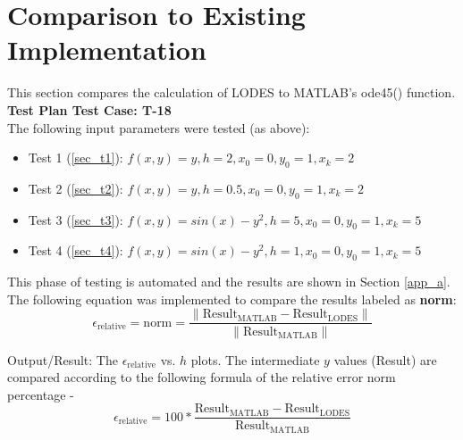 \documentclass[12pt, titlepage]{article}
\newcommand{\famname}{LODES} %
\begin{document}
	
\section{Comparison to Existing Implementation}	 \label{sec_comp_exist_imp}

This section compares the calculation of \famname{} to MATLAB's ode45() function.\\

\textbf{Test Plan Test Case: T-18}\\
The following input parameters were tested (as above):
\begin{itemize}
\item Test 1 (\ref{sec_t1}): $f(x,y) = y, h = 2,x_0 = 0,y_0 = 1,x_k = 2$
\item Test 2 (\ref{sec_t2}): $f(x,y) = y, h = 0.5,x_0 = 0,y_0 = 1,x_k = 2$
\item Test 3 (\ref{sec_t3}): $f(x,y) = sin(x) - y^2, h = 5,x_0 = 0,y_0 = 1,x_k = 5$
\item Test 4 (\ref{sec_t4}): $f(x,y) = sin(x) - y^2, h = 1,x_0 = 0,y_0 = 1,x_k = 5$
\end{itemize}

This phase of testing is automated and the results are shown in Section \ref{app_a}.
The following equation was implemented to compare the results labeled as \textbf{norm}:
$$\epsilon_{\text{relative}} = \text{norm} = \frac{\|\text{Result}_\text{MATLAB} - \text{Result}_\text{\famname{}}\|} {\| \text{Result}
_\text{MATLAB} \|} $$

Output/Result: The $\epsilon_{\text{relative}}$ vs. $h$ plots.
The intermediate $y$ values (Result) are compared according to the following formula of the relative error norm percentage -
$$\epsilon_{\text{relative}} =100 * \frac{\text{Result}_\text{MATLAB} - \text{Result}_\text{\famname{}}} {\text{Result}
_\text{MATLAB}} $$
\end{document}

